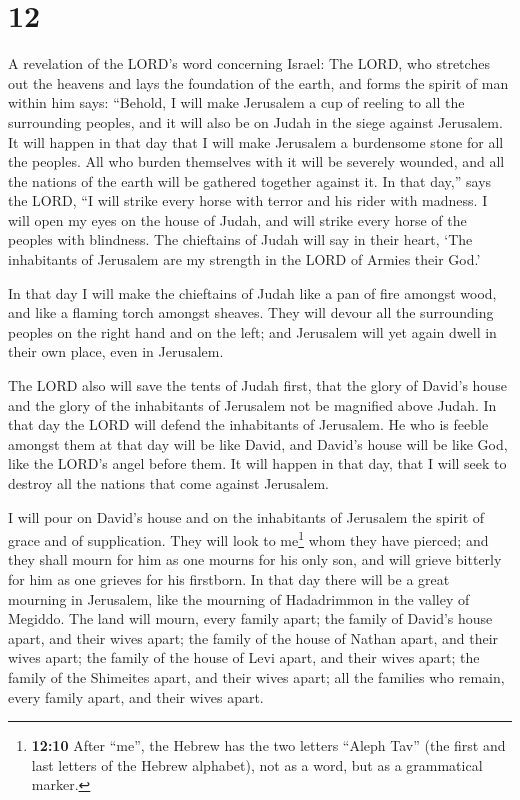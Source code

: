 \hypertarget{section-11}{%
\section{12}\label{section-11}}

 A revelation of the LORD's word concerning Israel: The
LORD, who stretches out the heavens and lays the foundation of the
earth, and forms the spirit of man within him says: 
``Behold, I will make Jerusalem a cup of reeling to all the surrounding
peoples, and it will also be on Judah in the siege against Jerusalem.
 It will happen in that day that I will make Jerusalem a
burdensome stone for all the peoples. All who burden themselves with it
will be severely wounded, and all the nations of the earth will be
gathered together against it.  In that day,'' says the
LORD, ``I will strike every horse with terror and his rider with
madness. I will open my eyes on the house of Judah, and will strike
every horse of the peoples with blindness.  The chieftains
of Judah will say in their heart, `The inhabitants of Jerusalem are my
strength in the LORD of Armies their God.'

 In that day I will make the chieftains of Judah like a
pan of fire amongst wood, and like a flaming torch amongst sheaves. They
will devour all the surrounding peoples on the right hand and on the
left; and Jerusalem will yet again dwell in their own place, even in
Jerusalem.

 The LORD also will save the tents of Judah first, that
the glory of David's house and the glory of the inhabitants of Jerusalem
not be magnified above Judah.  In that day the LORD will
defend the inhabitants of Jerusalem. He who is feeble amongst them at
that day will be like David, and David's house will be like God, like
the LORD's angel before them.  It will happen in that day,
that I will seek to destroy all the nations that come against Jerusalem.

 I will pour on David's house and on the inhabitants of
Jerusalem the spirit of grace and of supplication. They will look to
me\footnote{\textbf{12:10} After ``me'', the Hebrew has the two letters
  ``Aleph Tav'' (the first and last letters of the Hebrew alphabet), not
  as a word, but as a grammatical marker.} whom they have pierced; and
they shall mourn for him as one mourns for his only son, and will grieve
bitterly for him as one grieves for his firstborn.  In
that day there will be a great mourning in Jerusalem, like the mourning
of Hadadrimmon in the valley of Megiddo.  The land will
mourn, every family apart; the family of David's house apart, and their
wives apart; the family of the house of Nathan apart, and their wives
apart;  the family of the house of Levi apart, and their
wives apart; the family of the Shimeites apart, and their wives apart;
 all the families who remain, every family apart, and
their wives apart.

